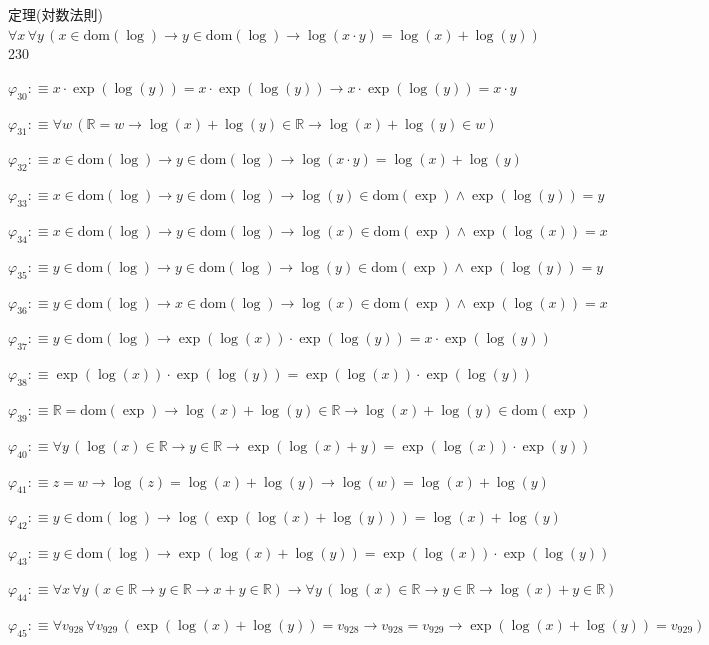 \begin{fullproof}{定理(対数法則)}{$\forall x\,\forall y\,(x \in \mathrm{dom}(\log) \to y \in \mathrm{dom}(\log) \to \log(x \cdot y) = \log(x) + \log(y))$}{230}
\begin{abbrevlist}
\item $\varphi_{30} :\equiv x \cdot \exp(\log(y)) = x \cdot \exp(\log(y)) \to x \cdot \exp(\log(y)) = x \cdot y$
\item $\varphi_{31} :\equiv \forall w\,(\mathbb{R} = w \to \log(x) + \log(y) \in \mathbb{R} \to \log(x) + \log(y) \in w)$
\item $\varphi_{32} :\equiv x \in \mathrm{dom}(\log) \to y \in \mathrm{dom}(\log) \to \log(x \cdot y) = \log(x) + \log(y)$
\item $\varphi_{33} :\equiv x \in \mathrm{dom}(\log) \to y \in \mathrm{dom}(\log) \to \log(y) \in \mathrm{dom}(\exp) \land \exp(\log(y)) = y$
\item $\varphi_{34} :\equiv x \in \mathrm{dom}(\log) \to y \in \mathrm{dom}(\log) \to \log(x) \in \mathrm{dom}(\exp) \land \exp(\log(x)) = x$
\item $\varphi_{35} :\equiv y \in \mathrm{dom}(\log) \to y \in \mathrm{dom}(\log) \to \log(y) \in \mathrm{dom}(\exp) \land \exp(\log(y)) = y$
\item $\varphi_{36} :\equiv y \in \mathrm{dom}(\log) \to x \in \mathrm{dom}(\log) \to \log(x) \in \mathrm{dom}(\exp) \land \exp(\log(x)) = x$
\item $\varphi_{37} :\equiv y \in \mathrm{dom}(\log) \to \exp(\log(x)) \cdot \exp(\log(y)) = x \cdot \exp(\log(y))$
\item $\varphi_{38} :\equiv \exp(\log(x)) \cdot \exp(\log(y)) = \exp(\log(x)) \cdot \exp(\log(y))$
\item $\varphi_{39} :\equiv \mathbb{R} = \mathrm{dom}(\exp) \to \log(x) + \log(y) \in \mathbb{R} \to \log(x) + \log(y) \in \mathrm{dom}(\exp)$
\item $\varphi_{40} :\equiv \forall y\,(\log(x) \in \mathbb{R} \to y \in \mathbb{R} \to \exp(\log(x) + y) = \exp(\log(x)) \cdot \exp(y))$
\item $\varphi_{41} :\equiv z = w \to \log(z) = \log(x) + \log(y) \to \log(w) = \log(x) + \log(y)$
\item $\varphi_{42} :\equiv y \in \mathrm{dom}(\log) \to \log(\exp(\log(x) + \log(y))) = \log(x) + \log(y)$
\item $\varphi_{43} :\equiv y \in \mathrm{dom}(\log) \to \exp(\log(x) + \log(y)) = \exp(\log(x)) \cdot \exp(\log(y))$
\item $\varphi_{44} :\equiv \forall x\,\forall y\,(x \in \mathbb{R} \to y \in \mathbb{R} \to x + y \in \mathbb{R}) \to \forall y\,(\log(x) \in \mathbb{R} \to y \in \mathbb{R} \to \log(x) + y \in \mathbb{R})$
\item $\varphi_{45} :\equiv \forall v_{928}\,\forall v_{929}\,(\exp(\log(x) + \log(y)) = v_{928} \to v_{928} = v_{929} \to \exp(\log(x) + \log(y)) = v_{929})$

\end{abbrevlist}
\end{fullproof}
